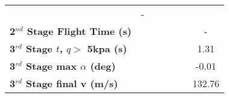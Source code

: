 \begin{tabular}{l c c c c c c}
	& -
	\\
	\textbf{2$^{nd}$ Stage Flight Time (s)}
	& \secondFlightTimeTThreeNinetyNoReturn
	& \secondFlightTimeTThreeNinetyFiveNoReturn
	& \secondFlightTimeTThreeStandardNoReturn
	& \secondFlightTimeTThreeOneHundredFiveNoReturn
	& \secondFlightTimeTThreeOneHundredTenNoReturn
	& -
	\\
	\textbf{3$^{rd}$ Stage $t$, $q >$ 5kpa (s)}
	& \thirdqOverFiveTThreeNinetyNoReturn
	& \thirdqOverFiveTThreeNinetyFiveNoReturn
	& \thirdqOverFiveTThreeStandardNoReturn
	& \thirdqOverFiveTThreeOneHundredFiveNoReturn
	& \thirdqOverFiveTThreeOneHundredTenNoReturn
	&1.31
	\\
	\textbf{3$^{rd}$ Stage max $\alpha$ (deg)}
	& \thirdmaxAoATThreeNinetyNoReturn
	& \thirdmaxAoATThreeNinetyFiveNoReturn
	& \thirdmaxAoATThreeStandardNoReturn
	& \thirdmaxAoATThreeOneHundredFiveNoReturn
	& \thirdmaxAoATThreeOneHundredTenNoReturn
	&-0.01
	\\
	\textbf{3$^{rd}$ Stage final v (m/s)}
	& \thirdcircvTThreeNinetyNoReturn
	& \thirdcircvTThreeNinetyFiveNoReturn
	& \thirdcircvTThreeStandardNoReturn
	& \thirdcircvTThreeOneHundredFiveNoReturn
	& \thirdcircvTThreeOneHundredTenNoReturn
	&132.76
	\\
	\hline 
\end{tabular} 

